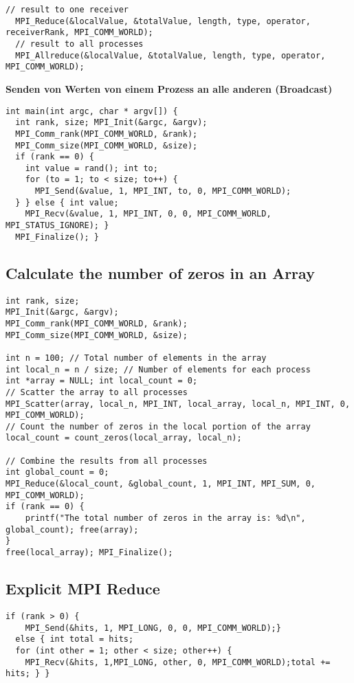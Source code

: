 \begin{lstlisting}[style=csharp]
  // result to one receiver
  MPI_Reduce(&localValue, &totalValue, length, type, operator, receiverRank, MPI_COMM_WORLD); 
  // result to all processes
  MPI_Allreduce(&localValue, &totalValue, length, type, operator, MPI_COMM_WORLD);	
\end{lstlisting}

\textbf{Senden von Werten von einem Prozess an alle anderen (Broadcast)}
\begin{lstlisting}[style=csharp]
int main(int argc, char * argv[]) {
  int rank, size; MPI_Init(&argc, &argv);
  MPI_Comm_rank(MPI_COMM_WORLD, &rank);
  MPI_Comm_size(MPI_COMM_WORLD, &size);
  if (rank == 0) {
    int value = rand(); int to;
    for (to = 1; to < size; to++) {
      MPI_Send(&value, 1, MPI_INT, to, 0, MPI_COMM_WORLD);
  } } else { int value;
    MPI_Recv(&value, 1, MPI_INT, 0, 0, MPI_COMM_WORLD, MPI_STATUS_IGNORE); }
  MPI_Finalize(); }
\end{lstlisting}

\subsection{Calculate the number of zeros in an Array}
\begin{lstlisting}[style=csharp]
int rank, size;
MPI_Init(&argc, &argv);
MPI_Comm_rank(MPI_COMM_WORLD, &rank);
MPI_Comm_size(MPI_COMM_WORLD, &size);

int n = 100; // Total number of elements in the array
int local_n = n / size; // Number of elements for each process
int *array = NULL; int local_count = 0;
// Scatter the array to all processes
MPI_Scatter(array, local_n, MPI_INT, local_array, local_n, MPI_INT, 0, MPI_COMM_WORLD);
// Count the number of zeros in the local portion of the array
local_count = count_zeros(local_array, local_n);

// Combine the results from all processes
int global_count = 0;
MPI_Reduce(&local_count, &global_count, 1, MPI_INT, MPI_SUM, 0, MPI_COMM_WORLD);
if (rank == 0) {
	printf("The total number of zeros in the array is: %d\n", global_count); free(array);
}
free(local_array); MPI_Finalize();
\end{lstlisting}
\subsection{Explicit MPI Reduce}
\begin{lstlisting}[style=csharp]
  if (rank > 0) {
    MPI_Send(&hits, 1, MPI_LONG, 0, 0, MPI_COMM_WORLD);} 
  else { int total = hits; 
  for (int other = 1; other < size; other++) {
    MPI_Recv(&hits, 1,MPI_LONG, other, 0, MPI_COMM_WORLD);total += hits; } }
\end{lstlisting}


